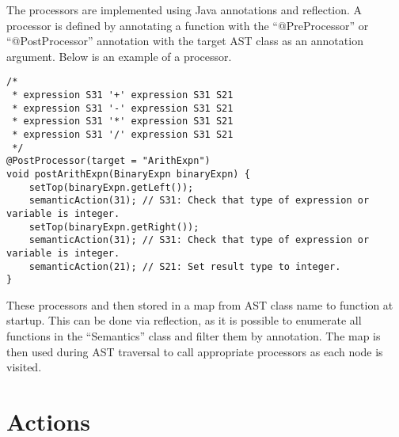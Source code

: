\documentclass[oneside]{amsart}
\theoremstyle{definition}
\theoremstyle{remark}
\numberwithin{equation}{section}
\begin{document}
The processors are implemented using Java annotations and reflection. A processor is defined by 
annotating a function with the ``@PreProcessor'' or ``@PostProcessor'' annotation with the target
AST class as an annotation argument. Below is an example of a processor.
\begin{lstlisting}
/*
 * expression S31 '+' expression S31 S21
 * expression S31 '-' expression S31 S21
 * expression S31 '*' expression S31 S21
 * expression S31 '/' expression S31 S21
 */
@PostProcessor(target = "ArithExpn")
void postArithExpn(BinaryExpn binaryExpn) {
    setTop(binaryExpn.getLeft());
    semanticAction(31); // S31: Check that type of expression or variable is integer.
    setTop(binaryExpn.getRight());
    semanticAction(31); // S31: Check that type of expression or variable is integer.
    semanticAction(21); // S21: Set result type to integer.
}
\end{lstlisting}
These processors and then stored in a map from AST class name to function at startup. This can be
done via reflection, as it is possible to enumerate all functions in the ``Semantics'' class and
filter them by annotation. The map is then used during AST traversal to call appropriate processors
as each node is visited.

\section{Actions}

\end{document}
